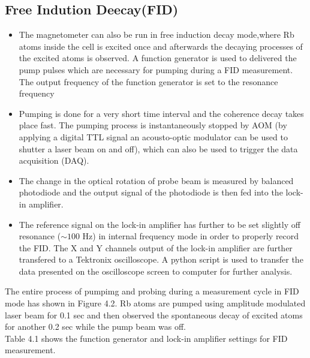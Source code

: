 \subsection{Free Indution Deecay(FID) }
\bigskip
\begin{itemize}
\item The magnetometer can also
be run in free induction decay mode,where Rb atoms inside the cell is excited once and afterwards the decaying processes of the excited atoms is observed. A function generator is used to delivered the pump pulses which are necessary for pumping during a FID measurement. The output frequency of the function generator is set to the resonance frequency
\item Pumping is done for a very short time interval and the coherence decay takes place fast. The pumping process is instantaneously stopped by AOM (by applying a digital TTL signal an acousto-optic modulator can be used to shutter a laser beam on and off), which can also be used to trigger the  data acquisition (DAQ). 
\item The change in the optical rotation of probe beam is measured by balanced  photodiode and the output signal of the photodiode is then fed into the lock-in amplifier.
\item The reference signal on the lock-in amplifier has further to be set slightly off resonance ($\sim 100$ Hz) in internal frequency mode in order to properly record the FID.
The X and Y channels output of the lock-in amplifier are further transfered to a Tektronix oscilloscope. A python script is used to transfer the data presented on the oscilloscope screen to computer for further analysis. 
\end{itemize}
The entire process of pumpimg and probing during a measurement cycle in FID mode  has shown in Figure 4.2. Rb atoms are pumped using amplitude modulated laser beam for 0.1 sec and then observed the spontaneous decay of excited atoms for another 0.2 sec while the pump beam was off. \\
Table 4.1 shows the function generator and lock-in amplifier settings for FID measurement.
